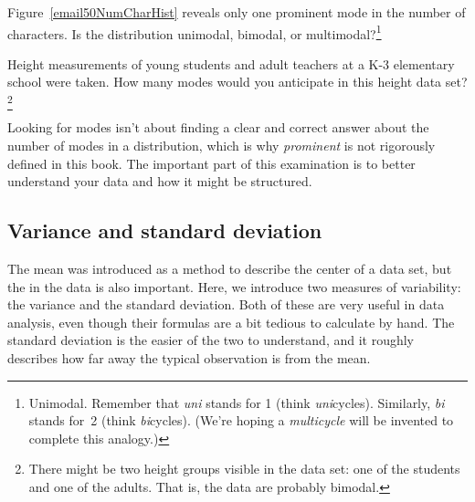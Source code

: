 \begin{exercise}
Figure~\ref{email50NumCharHist} reveals only one prominent mode in the number of characters. Is the distribution unimodal, bimodal, or multimodal?\footnote{Unimodal. Remember that \emph{uni} stands for 1 (think \emph{uni}cycles). Similarly, \emph{bi} stands for~2 (think \emph{bi}cycles). (We're hoping a \emph{multicycle} will be invented to complete this analogy.)}
\end{exercise}

\begin{exercise}
Height measurements of young students and adult teachers at a K-3 elementary school were taken. How many modes would you anticipate in this height data set?\footnote{There might be two height groups visible in the data set: one of the students and one of the adults. That is, the data are probably bimodal.}
\end{exercise}

\begin{tipBox}{
Looking for modes isn't about finding a clear and correct answer about the number of modes in a distribution, which is why \emph{prominent} is not rigorously defined in this book. The important part of this examination is to better understand your data and how it might be structured.}
\end{tipBox}


\subsection{Variance and standard deviation}
\label{variability}

The mean was introduced as a method to describe the center of a data set, but the  in the data is also important. Here, we introduce two measures of variability: the variance and the standard deviation. Both of these are very useful in data analysis, even though their formulas are a bit tedious to calculate by hand. The standard deviation is the easier of the two to understand, and it roughly describes how far away the typical observation is from the mean.

